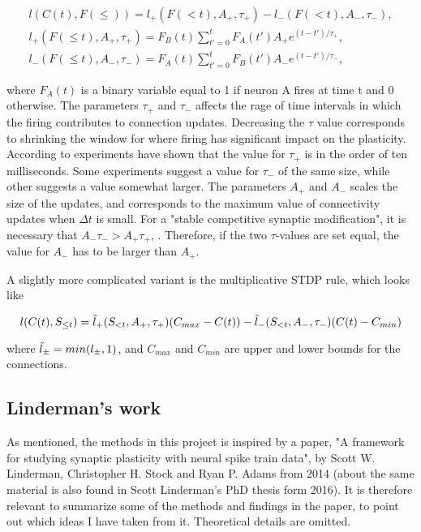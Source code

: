 \begin{equation}
\label{eq:STDP}
    \begin{split}
    l(C(t), F(\leq)) = l_+(F(<t), A_+,\tau_+) - l_-(F(<t), A_-,\tau_-),\\ 
    l_+(F(\leq t), A_+,\tau_+) = F_B(t) \sum_{t'=0}^{t} F_A(t') A_+ e^{(t-t')/\tau_+},\\ 
    l_-(F(\leq t), A_-,\tau_-) = F_A(t) \sum_{t'=0}^{t} F_B(t') A_- e^{(t-t')/\tau_-},
    \end{split}
\end{equation}

where $F_A(t)$ is a binary variable equal to 1 if neuron A fires at time t and 0 otherwise. The parameters $\tau_+$ and $\tau_-$ affects the rage of time intervals in which the firing contributes to connection updates. Decreasing the $\tau$ value corresponds to shrinking the window for where firing has significant impact on the plasticity. According to \cite{Song} experiments have shown that the value for $\tau_+$ is in the order of ten milliseconds. Some experiments suggest a value for $\tau_-$ of the same size, while other suggests a value somewhat larger. The parameters $A_+$ and $A_-$ scales the size of the updates, and corresponds to the maximum value of connectivity updates when $\Delta t$ is small. For a "stable competitive synaptic modification", it is necessary that $A_-\tau_- > A_+\tau_+$, \cite{Song}. Therefore, if the two $\tau$-values are set equal, the value for $A_-$ has to be larger than $A_+$.

A slightly more complicated variant is the multiplicative STDP rule, which looks like

\begin{equation}
    l(C(t), S_{\leq t}) = \Tilde{l}_+(S_{<t}, A_+,\tau_+)(C_{max} - C(t))  - \Tilde{l}_-(S_{<t}, A_-,\tau_-)(C(t) - C_{min})
\end{equation}

where $\Tilde{l}_{\pm} = min(l_{\pm},1)$, and $C_{max}$ and $C_{min}$ are upper and lower bounds for the connections. 

\subsection{Linderman's work}
\label{Linderman}
As mentioned, the methods in this project is inspired by a paper, "A framework for studying synaptic plasticity with neural spike train data", by Scott W. Linderman, Christopher H. Stock and Ryan P. Adams from 2014 (about the same material is also found in Scott Linderman's PhD thesis form 2016). It is therefore relevant to summarize some of the methods and findings in the paper, to point out which ideas I have taken from it. Theoretical details are omitted.

